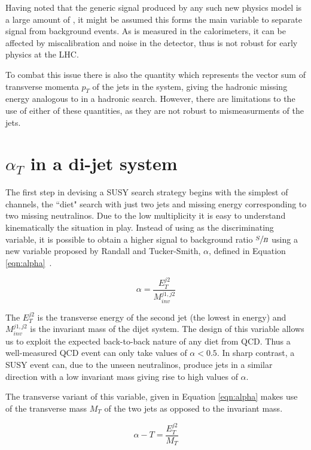 Having noted that the generic signal produced by any such new physics model is a large amount of \met, it might be assumed this forms the main variable to separate signal from background events. As \met is measured in the calorimeters, it can be affected by miscalibration and noise in the detector, thus is not robust for early physics at the LHC. 

To combat this issue there is also the quantity \mht which represents the vector sum of transverse momenta $p_{T}$ of the jets in the system, giving the hadronic missing energy analogous to \met in a hadronic search. However, there are limitations to the use of either of these quantities, as they are not robust to mismeasurments of the jets. 

\section{$\alpha_{T}$ in a di-jet system}

The first step in devising a SUSY search strategy begins with the simplest of channels, the ``diet" search with just two jets and missing energy corresponding to two missing neutralinos. Due to the low multiplicity it is easy to understand kinematically the situation in play. Instead of using \met as the discriminating variable, it is possible to obtain a higher signal to background ratio $\sfrac{S}{B}$ using a new variable proposed by Randall and Tucker-Smith, $\alpha$, defined in Equation \ref{eqn:alpha}~\cite{Randall}. 


\begin{equation}
\alpha = \frac{E_{T}^{j2}}{M_{inv}^{j1,j2}}
\label{eqn:alpha}
\end{equation}

The $E_{T}^{j2}$ is the transverse energy of the second jet (the lowest in energy) and $M_{inv}^{j1,j2}$ is the invariant mass of the dijet system. The design of this variable allows us to exploit the expected back-to-back nature of any diet from QCD. Thus a well-measured QCD event can only take values of $\alpha < 0.5$. In sharp contrast, a SUSY event can, due to the unseen neutralinos, produce jets in a similar direction with a low invariant mass giving rise to high values of $\alpha$.

The transverse variant of this variable, given in Equation \ref{eqn:alpha} makes use of the transverse mass $M_{T}$ of the two jets as opposed to the invariant mass.

\begin{equation}
\alpha-{T} = \frac{E_{T}^{j2}}{M_{T}} 
\label{eqn:alphat}
\end{equation}

